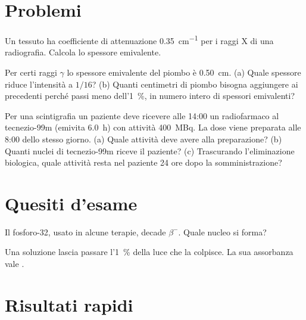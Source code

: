 
\section*{Problemi}


\problema\label{pb:ud7-hvl-tessuto}
Un tessuto ha coefficiente di attenuazione \SI[per-mode=power]{0,35}{\centi\metre\tothe{-1}} per i raggi X di una radiografia. Calcola lo spessore emivalente.


\problema\label{pb:ud7-piombo}
Per certi raggi $\gamma$ lo spessore emivalente del piombo è \SI{0,50}{\centi\metre}.
(a) Quale spessore riduce l'intensità a $1/16$?
(b) Quanti centimetri di piombo bisogna aggiungere ai precedenti perché passi meno dell'\SI{1}{\percent}, in numero intero di spessori emivalenti?


\problema\label{pb:ud7-tecnezio}
Per una scintigrafia un paziente deve ricevere alle 14:00 un radiofarmaco al tecnezio-99m (emivita \SI{6,0}{\hour}) con attività \SI{400}{\mega\becquerel}. La dose viene preparata alle 8:00 dello stesso giorno.
(a) Quale attività deve avere alla preparazione?
(b) Quanti nuclei di tecnezio-99m riceve il paziente?
(c) Trascurando l'eliminazione biologica, quale attività resta nel paziente 24 ore dopo la somministrazione?

\section*{Quesiti d'esame}

\quesito\label{qe:ud7-beta}
Il fosforo-32, usato in alcune terapie, decade $\beta^-$. Quale nucleo si forma?

\quesito\label{qe:ud7-assorbanza}
Una soluzione lascia passare l'\SI{1}{\percent} della luce che la colpisce. La sua assorbanza vale \completa.

\section*{Risultati rapidi}

